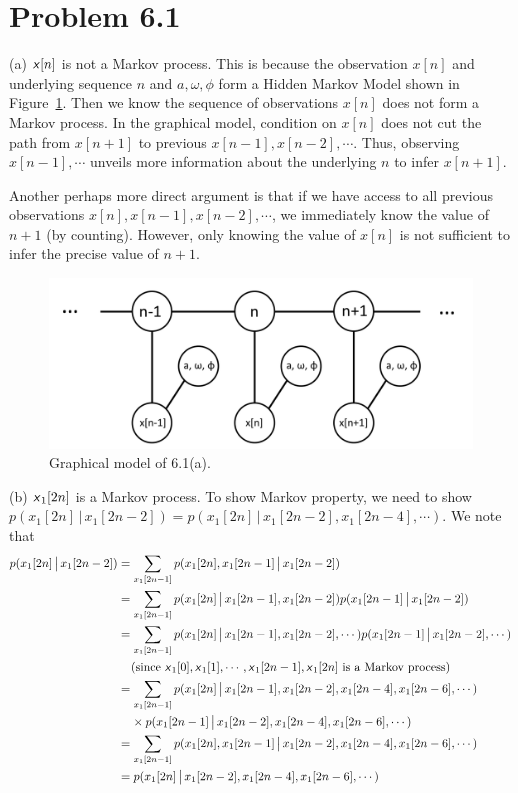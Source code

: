 \documentclass{article}
\newcommand{\s}[1]{\textsf{\textit{#1}}}
\newcommand{\qeds}{\hfill\qedsymbol}
\begin{document}
\section*{Problem 6.1}
%
(a) $\s{x}[n]$ is not a Markov process. This is because the observation $x[n]$ and underlying
sequence $n$ and $a, \omega, \phi$ form a Hidden Markov Model shown in Figure~\ref{f:61a}.
%
Then we know the sequence of observations $x[n]$ does not form a Markov process. In the graphical
model, condition on $x[n]$ does not cut the path from $x[n+1]$
to previous $x[n-1], x[n-2], \cdots$.
%
Thus, observing $x[n-1], \cdots$ unveils more information about the underlying $n$ to infer
$x[n+1]$.

Another perhaps more direct argument is that if we have access to all previous observations 
$x[n], x[n-1], x[n-2], \cdots$, we immediately know the value of $n+1$ (by counting). However,
only knowing the value of $x[n]$ is not sufficient to infer the precise value of $n+1$.
\qeds
\\
\begin{figure}[h!]
  \centering
  \vspace{-0.3cm}
  \includegraphics[width=0.5\columnwidth]{61a.png}
    \vspace{-0.1cm}
  \caption{Graphical model of 6.1(a).}
  \label{f:61a}
\end{figure}

\noindent
(b) $\s{x}_1[2n]$ is a Markov process. To show Markov property, we need to show
$p(x_1[2n] \,\big|\, x_1[2n - 2]) = p(x_1[2n] \,\big|\, x_1[2n - 2], x_1[2n -4], \cdots)$. We note that
\begin{align*}
p(x_1[2n] \,\big|\, x_1[2n - 2])	 &=
\sum_{x_1[2n - 1]} p(x_1[2n], x_1[2n-1] \,\big|\, x_1[2n - 2])\\
&= \sum_{x_1[2n - 1]} p(x_1[2n] \,\big|\, x_1[2n-1], x_1[2n-2])
p(x_1[2n-1] \,\big|\, x_1[2n-2])\\
&= \sum_{x_1[2n - 1]} p(x_1[2n] \,\big|\, x_1[2n-1], x_1[2n-2], \cdots)
p(x_1[2n-1] \,\big|\, x_1[2n-2], \cdots)\\
&\;\;\;\;\text{(since $\s{x}_1[0], \s{x}_1[1], \cdots, \s{x}_1[2n-1], \s{x}_1[2n]$ is a Markov process)}\\
&= \sum_{x_1[2n - 1]} p(x_1[2n] \,\big|\, x_1[2n-1], x_1[2n-2], x_1[2n-4], x_1[2n-6], \cdots)\\
&\;\;\;\; \times p(x_1[2n-1] \,\big|\, x_1[2n-2], x_1[2n-4], x_1[2n-6], \cdots)\\
&= \sum_{x_1[2n - 1]} p(x_1[2n], x_1[2n-1] \,\big|\, x_1[2n-2], x_1[2n-4], x_1[2n-6], \cdots)\\
& = p(x_1[2n] \,\big|\, x_1[2n-2], x_1[2n-4], x_1[2n-6], \cdots)
\end{align*} \qeds
\end{document}

